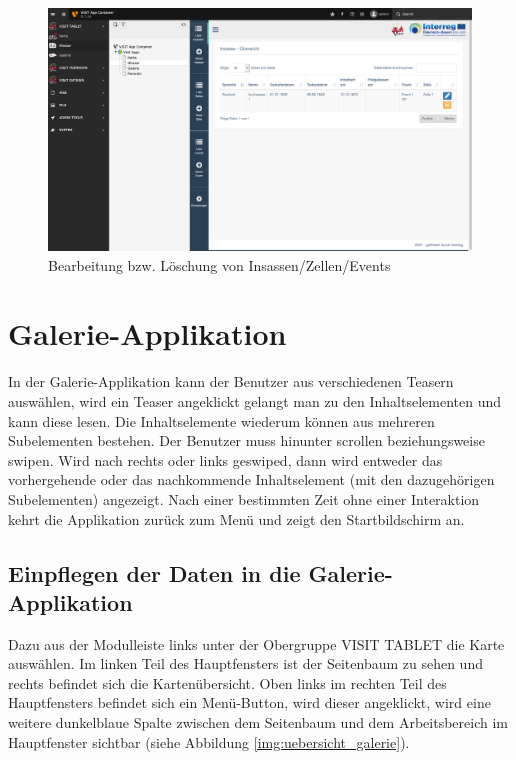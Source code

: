 \begin{figure}[ht!]
\centering
\includegraphics[width=12cm]{Figures/paula/glossar/loeschen_bearbeiten_insasse.png}
\caption{Bearbeitung bzw. Löschung von Insassen/Zellen/Events}
\label{img:loeschung_insassen}
\end{figure}




\section{Galerie-Applikation}

In der Galerie-Applikation kann der Benutzer aus verschiedenen Teasern auswählen, wird ein Teaser angeklickt gelangt man zu den Inhaltselementen und kann diese lesen. Die Inhaltselemente wiederum können aus mehreren Subelementen bestehen. Der Benutzer muss hinunter scrollen beziehungsweise swipen.
Wird nach rechts oder links geswiped, dann wird entweder das vorhergehende oder das nachkommende Inhaltselement (mit den dazugehörigen Subelementen) angezeigt.
Nach einer bestimmten Zeit ohne einer Interaktion kehrt die Applikation zurück zum Menü und zeigt den Startbildschirm an.

\subsection{Einpflegen der Daten in die Galerie-Applikation}

Dazu aus der Modulleiste links unter der Obergruppe VISIT TABLET die Karte auswählen. Im linken Teil des Hauptfensters ist der Seitenbaum zu sehen und rechts befindet sich die Kartenübersicht. Oben links im rechten Teil des Hauptfensters befindet sich ein Menü-Button, wird dieser angeklickt, wird eine weitere dunkelblaue Spalte zwischen dem Seitenbaum und dem Arbeitsbereich im Hauptfenster sichtbar (siehe Abbildung \ref{img:uebersicht_galerie}).

